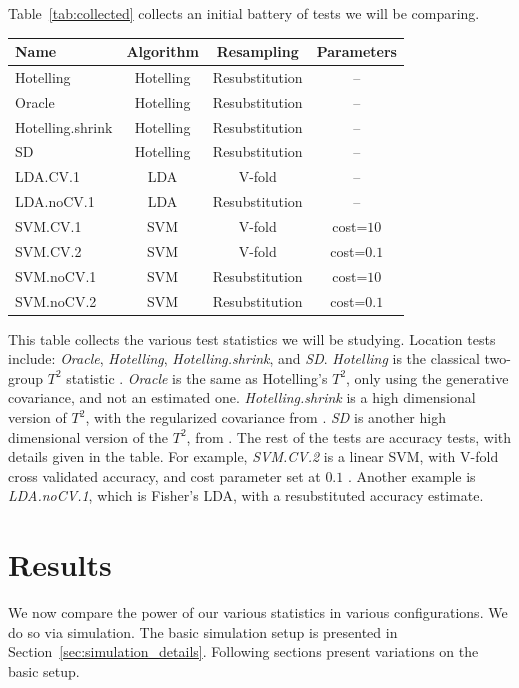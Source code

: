 \documentclass[12pt,a4paper]{article}
\begin{document}
Table~\ref{tab:collected} collects an initial battery of tests we will be comparing. 
\begin{tcolorbox}
\centering
\begin{tabular}{l|c|c|c}
Name & Algorithm & Resampling & Parameters\\ 
\hline
\hline
Hotelling & Hotelling & Resubstitution & -- \\ 
Oracle & Hotelling & Resubstitution & -- \\ 
Hotelling.shrink & Hotelling & Resubstitution & -- \\ 
SD & Hotelling & Resubstitution & -- \\ 
LDA.CV.1 	& LDA & V-fold 			&  -- \\ 
LDA.noCV.1 	& LDA & Resubstitution 	&  --\\ 
SVM.CV.1 	& SVM & V-fold 		    & cost=$10$ \\ 
SVM.CV.2 	& SVM & V-fold 		    & cost=$0.1$ \\ 
SVM.noCV.1 	& SVM & Resubstitution  & cost=$10$ \\ 
SVM.noCV.2 	& SVM & Resubstitution  & cost=$0.1$ \\ 
\end{tabular} 
\captionsetup{type=table}
\caption{\footnotesize
This table collects the various test statistics we will be studying. 
Location tests include: \textit{Oracle}, \textit{Hotelling}, \textit{Hotelling.shrink}, and \textit{SD}.
\textit{Hotelling} is the classical two-group $T^2$ statistic \citep{anderson_introduction_2003}. 
\textit{Oracle} is the same as Hotelling's $T^2$, only using the generative covariance, and not an estimated one.
\textit{Hotelling.shrink} is a high dimensional version of $T^2$, with the regularized covariance from \citet{schafer_shrinkage_2005}. 
\textit{SD} is another high dimensional version of the $T^2$, from \citet{srivastava_two_2013}.
The rest of the tests are accuracy tests, with details given in the table. 
For example, \textit{SVM.CV.2} is a linear SVM, with V-fold cross validated accuracy, and cost parameter set at $0.1$ \citep{meyer_e1071:_2015}.
Another example is \textit{LDA.noCV.1}, which is Fisher's LDA, with a resubstituted accuracy estimate.}
\label{tab:collected}
\end{tcolorbox}






\section{Results}
\label{sec:results}
We now compare the power of our various statistics in various configurations. 
We do so via simulation.
The basic simulation setup is presented in Section~\ref{sec:simulation_details}.
Following sections present variations on the basic setup.
\end{document}
